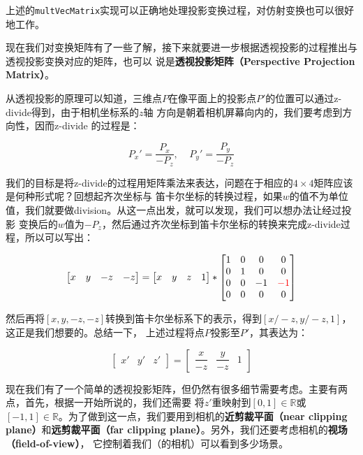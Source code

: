 \documentclass[12pt]{article}
\begin{document}
\noindent{}上述的\texttt{multVecMatrix}实现可以正确地处理投影变换过程，对仿射变换也可以很好地工作。

\indent{}现在我们对变换矩阵有了一些了解，接下来就要进一步根据透视投影的过程推出与透视投影变换对应的矩阵，也可以
说是\textbf{透视投影矩阵（Perspective Projection Matrix）}。

\indent{}从透视投影的原理可以知道，三维点$P$在像平面上的投影点$P'$的位置可以通过z-divide得到，由于相机坐标系的$z$轴
方向是朝着相机屏幕向内的，我们要考虑到方向性，因而z-divide 的过程是：

\begin{displaymath}
P_{x}' = \frac{P_x}{-P_z}, \;\;\;\; P_{y}' = \frac{P_y}{-P_z}
\end{displaymath}

\indent{}我们的目标是将z-divide的过程用矩阵乘法来表达，问题在于相应的$4\times 4$矩阵应该是何种形式呢？回想起齐次坐标与
笛卡尔坐标的转换过程，如果$w$的值不为单位值，我们就要做division。从这一点出发，就可以发现，我们可以想办法让经过投影
变换后的$w$值为$-P_z$，然后通过齐次坐标到笛卡尔坐标的转换来完成z-divide过程，所以可以写出：

\begin{displaymath}
\begin{bmatrix}
x & y & -z & -z
\end{bmatrix}
=
\begin{bmatrix}
x & y & z & 1
\end{bmatrix}
*
\begin{bmatrix}
1 & 0 & 0 & 0\\
0 & 1 & 0 & 0\\
0 & 0 & -1 & \color{red}{-1}\\
0 & 0 & 0 & 0
\end{bmatrix}
\end{displaymath}

\noindent{}然后再将$[x,y,-z,-z]$转换到笛卡尔坐标系下的表示，得到$[x/-z,y/-z,1]$，这正是我们想要的。总结一下，
上述过程将点$P$投影至$P'$，其表达为：

\begin{displaymath}
\begin{bmatrix}
x' & y' & z'
\end{bmatrix}
=
\begin{bmatrix}
\dfrac{x}{-z} & \dfrac{y}{-z} & 1
\end{bmatrix}
\end{displaymath}

\indent{}现在我们有了一个简单的透视投影矩阵，但仍然有很多细节需要考虑。主要有两点，首先，根据一开始所说的，我们还需要
将$z'$重映射到$[0,1]\in\mathbb{R}$或$[-1,1]\in\mathbb{R}$。为了做到这一点，我们要用到相机的\textbf{近剪裁平面（near
clipping plane）}和\textbf{远剪裁平面（far clipping plane）}。另外，我们还要考虑相机的\textbf{视场（field-of-view）}，
它控制着我们（的相机）可以看到多少场景。
\end{document}
